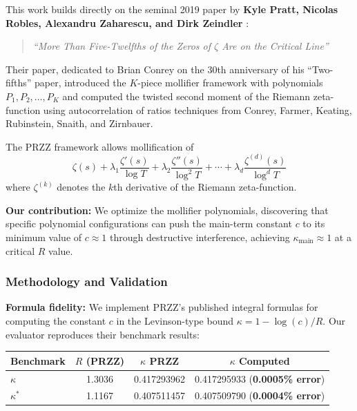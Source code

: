 \documentclass[11pt]{article}
\begin{document}
This work builds directly on the seminal 2019 paper by \textbf{Kyle Pratt, Nicolas Robles, Alexandru Zaharescu, and Dirk Zeindler} \cite{PRZZ2019}:

\begin{quotation}
\textit{``More Than Five-Twelfths of the Zeros of $\zeta$ Are on the Critical Line''}
\end{quotation}

Their paper, dedicated to Brian Conrey on the 30th anniversary of his ``Two-fifths'' paper, introduced the $K$-piece mollifier framework with polynomials $P_1, P_2, \ldots, P_K$ and computed the twisted second moment of the Riemann zeta-function using autocorrelation of ratios techniques from Conrey, Farmer, Keating, Rubinstein, Snaith, and Zirnbauer.

The PRZZ framework allows mollification of
\begin{equation}
\zeta(s) + \lambda_1 \frac{\zeta'(s)}{\log T} + \lambda_2 \frac{\zeta''(s)}{\log^2 T} + \cdots + \lambda_d \frac{\zeta^{(d)}(s)}{\log^d T}
\end{equation}
where $\zeta^{(k)}$ denotes the $k$th derivative of the Riemann zeta-function.

\textbf{Our contribution:} We optimize the mollifier polynomials, discovering that specific polynomial configurations can push the main-term constant $c$ to its minimum value of $c \approx 1$ through destructive interference, achieving $\kappa_{\text{main}} \approx 1$ at a critical $R$ value.

\subsubsection{Methodology and Validation}

\textbf{Formula fidelity:} We implement PRZZ's published integral formulas for computing the constant $c$ in the Levinson-type bound $\kappa = 1 - \log(c)/R$. Our evaluator reproduces their benchmark results:

\begin{center}
\begin{tabular}{lccc}
\toprule
Benchmark & $R$ (PRZZ) & $\kappa$ PRZZ & $\kappa$ Computed \\
\midrule
$\kappa$ & 1.3036 & 0.417293962 & 0.417295933 (\textbf{0.0005\% error}) \\
$\kappa^*$ & 1.1167 & 0.407511457 & 0.407509790 (\textbf{0.0004\% error}) \\
\bottomrule
\end{tabular}
\end{center}
\end{document}
